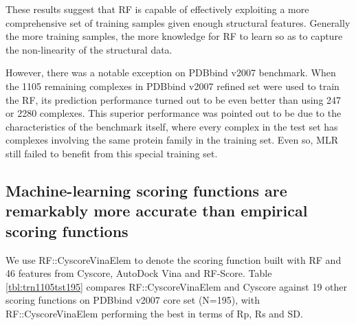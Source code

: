 \documentclass[journal=jacsat,manuscript=article]{achemso}
\begin{document}
These results suggest that RF is capable of effectively exploiting a more comprehensive set of training samples given enough structural features. Generally the more training samples, the more knowledge for RF to learn so as to capture the non-linearity of the structural data.

However, there was a notable exception on PDBbind v2007 benchmark. When the 1105 remaining complexes in PDBbind v2007 refined set were used to train the RF, its prediction performance turned out to be even better than using 247 or 2280 complexes. This superior performance was pointed out \cite{774} to be due to the characteristics of the benchmark itself, where every complex in the test set has complexes involving the same protein family in the training set. Even so, MLR still failed to benefit from this special training set.

\subsection{Machine-learning scoring functions are remarkably more accurate than empirical scoring functions}

We use RF::CyscoreVinaElem to denote the scoring function built with RF and 46 features from Cyscore, AutoDock Vina and RF-Score. Table \ref{tbl:trn1105tst195} compares RF::CyscoreVinaElem and Cyscore against 19 other scoring functions on PDBbind v2007 core set (N=195), with RF::CyscoreVinaElem performing the best in terms of Rp, Rs and SD.
\end{document}

